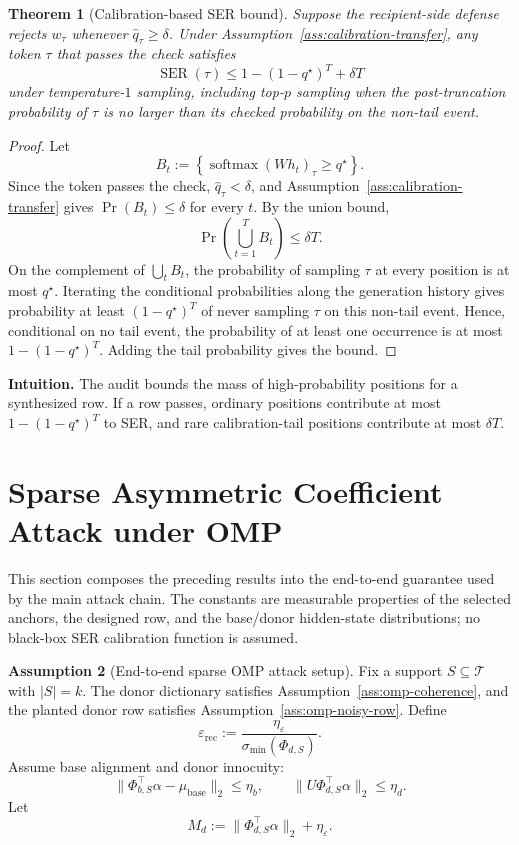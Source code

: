 \documentclass{article}
\theoremstyle{plain}
\newtheorem{theorem}{Theorem}[section]
\theoremstyle{definition}
\newtheorem{assumption}[theorem]{Assumption}
\theoremstyle{remark}
\begin{document}
\begin{theorem}[Calibration-based SER bound]
\label{thm:calibration-ser-bound}
Suppose the recipient-side defense rejects $w_\tau$ whenever $\widehat{q}_\tau\ge\delta$. Under Assumption~\ref{ass:calibration-transfer}, any token $\tau$ that passes the check satisfies
\[
\operatorname{SER}(\tau)
\le
1-(1-q^\star)^T+
\delta T
\]
under temperature-$1$ sampling, including top-$p$ sampling when the post-truncation probability of $\tau$ is no larger than its checked probability on the non-tail event.
\end{theorem}

\begin{proof}
Let
\[
B_t:=\left\{\operatorname{softmax}(Wh_t)_\tau\ge q^\star\right\}.
\]
Since the token passes the check, $\widehat{q}_\tau<\delta$, and Assumption~\ref{ass:calibration-transfer} gives $\Pr(B_t)\le\delta$ for every $t$. By the union bound,
\[
\Pr\left(\bigcup_{t=1}^{T}B_t\right)
\le
\delta T.
\]
On the complement of $\bigcup_t B_t$, the probability of sampling $\tau$ at every position is at most $q^\star$. Iterating the conditional probabilities along the generation history gives probability at least $(1-q^\star)^T$ of never sampling $\tau$ on this non-tail event. Hence, conditional on no tail event, the probability of at least one occurrence is at most $1-(1-q^\star)^T$. Adding the tail probability gives the bound.
\end{proof}

\noindent\textbf{Intuition.}
The audit bounds the mass of high-probability positions for a synthesized row. If a row passes, ordinary positions contribute at most $1-(1-q^\star)^T$ to SER, and rare calibration-tail positions contribute at most $\delta T$.

\section{Sparse Asymmetric Coefficient Attack under OMP}
\label{app:omp-end-to-end-main}

This section composes the preceding results into the end-to-end guarantee used by the main attack chain. The constants are measurable properties of the selected anchors, the designed row, and the base/donor hidden-state distributions; no black-box SER calibration function is assumed.

\begin{assumption}[End-to-end sparse OMP attack setup]
\label{ass:end-to-end-omp-setup}
Fix a support $S\subseteq\mathcal{T}$ with $|S|=k$. The donor dictionary satisfies Assumption~\ref{ass:omp-coherence}, and the planted donor row satisfies Assumption~\ref{ass:omp-noisy-row}. Define
\[
\varepsilon_{\mathrm{rec}}
:=
\frac{\eta_\varepsilon}{\sigma_{\min}(\Phi_{d,S})}.
\]
Assume base alignment and donor innocuity:
\[
\|\Phi_{b,S}^\top\alpha-\mu_{\text{base}}\|_2\le \eta_b,
\qquad
\|U\Phi_{d,S}^\top\alpha\|_2\le \eta_d.
\]
Let
\[
M_d:=\|\Phi_{d,S}^\top\alpha\|_2+\eta_\varepsilon.
\]
\end{assumption}
\end{document}
